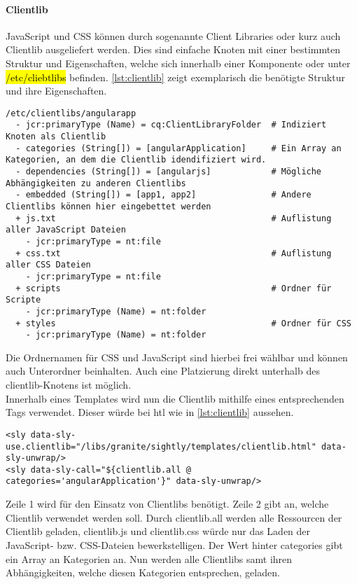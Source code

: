 \paragraph{Clientlib}
\label{sec:clientlib}
JavaScript und CSS können durch sogenannte Client Libraries oder kurz auch Clientlib ausgeliefert werden. Dies sind einfache Knoten mit einer bestimmten Struktur und Eigenschaften, welche sich innerhalb einer Komponente oder unter \hl{/etc/cliebtlibs} befinden. \autoref{lst:clientlib} zeigt exemplarisch die benötigte Struktur und ihre Eigenschaften.

\begin{lstlisting}[style=jcr, caption=Exemplarische Darstellung einer Clientlib, label=lst:clientlib]
/etc/clientlibs/angularapp
  - jcr:primaryType (Name) = cq:ClientLibraryFolder  # Indiziert Knoten als Clientlib
  - categories (String[]) = [angularApplication]     # Ein Array an Kategorien, an dem die Clientlib idendifiziert wird.
  - dependencies (String[]) = [angularjs]            # Mögliche Abhängigkeiten zu anderen Clientlibs
  - embedded (String[]) = [app1, app2]               # Andere Clientlibs können hier eingebettet werden
  + js.txt                                           # Auflistung aller JavaScript Dateien
    - jcr:primaryType = nt:file
  + css.txt                                          # Auflistung aller CSS Dateien
    - jcr:primaryType = nt:file
  + scripts                                          # Ordner für Scripte
    - jcr:primaryType (Name) = nt:folder
  + styles                                           # Ordner für CSS
    - jcr:primaryType (Name) = nt:folder
\end{lstlisting}

Die Ordnernamen für CSS und JavaScript sind hierbei frei wählbar und können auch Unterordner beinhalten. Auch eine Platzierung direkt unterhalb des clientlib-Knotens ist möglich.\\
Innerhalb eines Templates wird nun die Clientlib mithilfe eines entsprechenden Tags verwendet. Dieser würde bei \ac{htl} wie in \autoref{lst:clientlib} aussehen.

\begin{lstlisting}[style=htmlcssjs,caption=Verwendung einer Clientlib in AEM, label=lst:clientlib_useage]
<sly data-sly-use.clientlib="/libs/granite/sightly/templates/clientlib.html" data-sly-unwrap/>
<sly data-sly-call="${clientlib.all @ categories='angularApplication'}" data-sly-unwrap/>
\end{lstlisting}

Zeile 1 wird für den Einsatz von Clientlibs benötigt. Zeile 2 gibt an, welche Clientlib verwendet werden soll. Durch clientlib.all werden alle Ressourcen der Clientlib geladen, clientlib.js und clientlib.css würde nur das Laden der JavaScript- bzw. CSS-Dateien bewerkstelligen. Der Wert hinter categories gibt ein Array an Kategorien an. Nun werden alle Clientlibs samt ihren Abhängigkeiten, welche diesen Kategorien entsprechen, geladen.